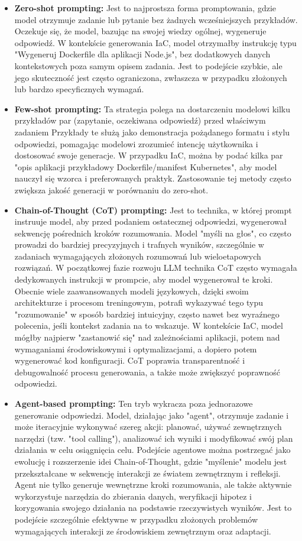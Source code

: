 \begin{itemize}
	\item \textbf{Zero-shot prompting:} Jest to najprostsza forma promptowania, gdzie model otrzymuje zadanie lub pytanie bez żadnych wcześniejszych przykładów. Oczekuje się, że model, bazując na swojej wiedzy ogólnej, wygeneruje odpowiedź. W kontekście generowania IaC, model otrzymałby instrukcję typu "Wygeneruj Dockerfile dla aplikacji Node.js", bez dodatkowych danych kontekstowych poza samym opisem zadania. Jest to podejście szybkie, ale jego skuteczność jest często ograniczona, zwłaszcza w przypadku złożonych lub bardzo specyficznych wymagań.
	\item \textbf{Few-shot prompting:} Ta strategia polega na dostarczeniu modelowi kilku przykładów par (zapytanie, oczekiwana odpowiedź) przed właściwym zadaniem \cite{brown_language_2020} Przykłady te służą jako demonstracja pożądanego formatu i stylu odpowiedzi, pomagając modelowi zrozumieć intencję użytkownika i dostosować swoje generacje. W przypadku IaC, można by podać kilka par "opis aplikacji \textrightarrow{} przykładowy Dockerfile/manifest Kubernetes", aby model nauczył się wzorca i preferowanych praktyk. Zastosowanie tej metody często zwiększa jakość generacji w porównaniu do zero-shot.
	\item \textbf{Chain-of-Thought (CoT) prompting:} Jest to technika, w której prompt instruuje model, aby przed podaniem ostatecznej odpowiedzi, wygenerował sekwencję pośrednich kroków rozumowania. Model "myśli na głos", co często prowadzi do bardziej precyzyjnych i trafnych wyników, szczególnie w zadaniach wymagających złożonych rozumowań lub wieloetapowych rozwiązań. W początkowej fazie rozwoju LLM technika CoT często wymagała dedykowanych instrukcji w prompcie, aby model wygenerował te kroki. Obecnie wiele zaawansowanych modeli językowych, dzięki swoim architekturze i procesom treningowym, potrafi wykazywać tego typu "rozumowanie" w sposób bardziej intuicyjny, często nawet bez wyraźnego polecenia, jeśli kontekst zadania na to wskazuje. W kontekście IaC, model mógłby najpierw "zastanowić się" nad zależnościami aplikacji, potem nad wymaganiami środowiskowymi i optymalizacjami, a dopiero potem wygenerować kod konfiguracji. CoT poprawia transparentność i debugowalność procesu generowania, a także może zwiększyć poprawność odpowiedzi.
	\item \textbf{Agent-based prompting:} Ten tryb wykracza poza jednorazowe generowanie odpowiedzi. Model, działając jako "agent", otrzymuje zadanie i może iteracyjnie wykonywać szereg akcji: planować, używać zewnętrznych narzędzi (tzw. "tool calling"), analizować ich wyniki i modyfikować swój plan działania w celu osiągnięcia celu. Podejście agentowe można postrzegać jako ewolucję i rozszerzenie idei Chain-of-Thought, gdzie "myślenie" modelu jest przekształcane w sekwencję interakcji ze światem zewnętrznym i refleksji. Agent nie tylko generuje wewnętrzne kroki rozumowania, ale także aktywnie wykorzystuje narzędzia do zbierania danych, weryfikacji hipotez i korygowania swojego działania na podstawie rzeczywistych wyników. Jest to podejście szczególnie efektywne w przypadku złożonych problemów wymagających interakcji ze środowiskiem zewnętrznym oraz adaptacji.
\end{itemize}


